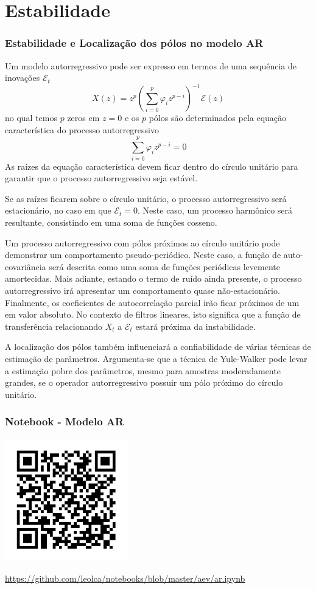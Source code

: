\section{Estabilidade}
\begin{frame}[allowframebreaks]
  \frametitle{Estabilidade e Localização dos pólos no modelo AR}
  Um modelo autorregressivo pode ser expresso em termos de uma
  sequência de inovações $\mathcal{E}_t$
  \begin{equation}
        X (z) = z^p \left( \sum_{i=0}^{p} \varphi_i z^{p-i} \right)^{-1} \mathcal{E}(z)
  \end{equation}
  no qual temos $p$ zeros em $z=0$ e os $p$ pólos são determinados
  pela equação característica do processo autorregressivo
  \begin{equation}
        \sum_{i=0}^{p} \varphi_i z^{p-i} = 0
  \end{equation}
  As raízes da equação característica devem ficar dentro do círculo
  unitário para garantir que o processo autorregressivo seja estável.
  
  Se as raízes ficarem sobre o círculo unitário, o processo autorregressivo
  será estacionário, no caso em que $\mathcal{E}_t = 0$. Neste caso,
  um processo harmônico será resultante, consistindo em uma soma de funções
  cosseno. 
  
  Um processo autorregressivo com pólos próximos ao círculo unitário
  pode demonstrar um comportamento pseudo-periódico. Neste caso,
  a função de auto-covariância será descrita como uma soma de funções
  periódicas levemente amortecidas. Mais adiante, estando o termo de 
  ruído ainda presente, o processo autorregressivo irá apresentar
  um comportamento quase não-estacionário.
  Finalmente, os coeficientes de autocorrelação parcial irão ficar
  próximos de um em valor absoluto. No contexto de filtros lineares,
  isto significa que a função de transferência relacionando $X_t$ a
  $\mathcal{E}_t$ estará próxima da instabilidade.
  
  A localização dos pólos também influenciará a confiabilidade
  de várias técnicas de estimação de parâmetros. Argumenta-se que
  a técnica de Yule-Walker pode levar a estimação pobre dos parâmetros,
  mesmo para amostras moderadamente grandes, se o operador autorregressivo
  possuir um pólo próximo do círculo unitário.
\end{frame}


\begin{frame}%
  \frametitle{Notebook - Modelo AR}
  \centering
  \includegraphics[width=0.4\textwidth]{images/qrcode-jupyter-ar.pdf}

  \url{https://github.com/leolca/notebooks/blob/master/aev/ar.ipynb}
\end{frame} 

